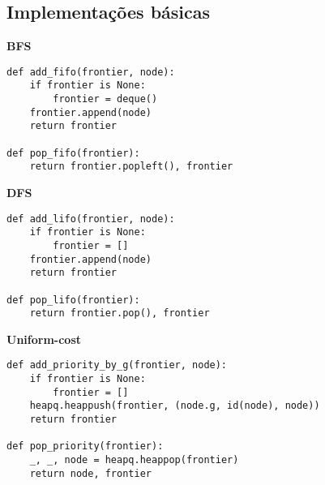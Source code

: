 \documentclass[9pt,a4paper]{extarticle}
\begin{document}
\subsection*{Implementações básicas}

\textbf{BFS}

\begin{lstlisting}
def add_fifo(frontier, node):
    if frontier is None:
        frontier = deque()
    frontier.append(node)
    return frontier

def pop_fifo(frontier):
    return frontier.popleft(), frontier
\end{lstlisting}

\textbf{DFS}

\begin{lstlisting}
def add_lifo(frontier, node):
    if frontier is None:
        frontier = []
    frontier.append(node)
    return frontier

def pop_lifo(frontier):
    return frontier.pop(), frontier
\end{lstlisting}

\textbf{Uniform-cost}
\begin{lstlisting}
def add_priority_by_g(frontier, node):
    if frontier is None:
        frontier = []
    heapq.heappush(frontier, (node.g, id(node), node))
    return frontier

def pop_priority(frontier):
    _, _, node = heapq.heappop(frontier)
    return node, frontier
\end{lstlisting}
\end{document}

